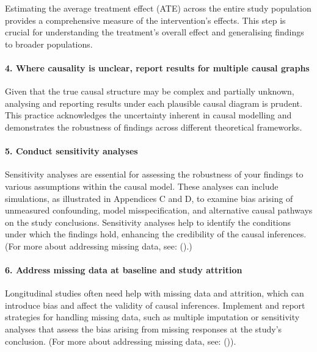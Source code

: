 \documentclass[
  single column]{article}
\let\oldparagraph\paragraph
\renewcommand{\paragraph}[1]{\oldparagraph{#1}\mbox{}}
\begin{document}
Estimating the average treatment effect (ATE) across the entire study
population provides a comprehensive measure of the intervention's
effects. This step is crucial for understanding the treatment's overall
effect and generalising findings to broader populations.

\paragraph{4. Where causality is unclear, report results for multiple
causal
graphs}\label{where-causality-is-unclear-report-results-for-multiple-causal-graphs}

Given that the true causal structure may be complex and partially
unknown, analysing and reporting results under each plausible causal
diagram is prudent. This practice acknowledges the uncertainty inherent
in causal modelling and demonstrates the robustness of findings across
different theoretical frameworks.

\paragraph{5. Conduct sensitivity
analyses}\label{conduct-sensitivity-analyses}

Sensitivity analyses are essential for assessing the robustness of your
findings to various assumptions within the causal model. These analyses
can include simulations, as illustrated in Appendices C and D, to
examine bias arising of unmeasured confounding, model misspecification,
and alternative causal pathways on the study conclusions. Sensitivity
analyses help to identify the conditions under which the findings hold,
enhancing the credibility of the causal inferences. (For more about
addressing missing data, see:
().)

\paragraph{6. Address missing data at baseline and study
attrition}\label{address-missing-data-at-baseline-and-study-attrition}

Longitudinal studies often need help with missing data and attrition,
which can introduce bias and affect the validity of causal inferences.
Implement and report strategies for handling missing data, such as
multiple imputation or sensitivity analyses that assess the bias arising
from missing responses at the study's conclusion. (For more about
addressing missing data, see:
()).
\end{document}
